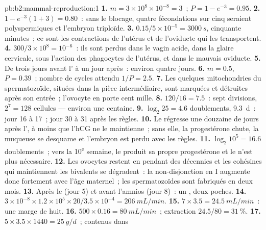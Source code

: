 \begin{solution}{pb:b2:mammal-reproduction:1}
\textbf{1.} $m = 3\times 10^{8}\times 10^{-8} = 3$~; $P = 1 - e^{-3} =
0.95$.
\textbf{2.} $1 - e^{-3}(1 + 3) = 0.80$~: sans le blocage, quatre
fécondations sur cinq seraient polyspermiques et l'embryon triploïde.
\textbf{3.} $0.15/5\times 10^{-5} = \qty{3000}{s}$, cinquante minutes~;
ce sont les contractions de l'utérus et de l'oviducte qui les
transportent.
\textbf{4.} $300/3\times 10^{8} = 10^{-6}$~: ils sont perdus dans le
vagin acide, dans la glaire cervicale, sous l'action des phagocytes de
l'utérus, et dans le mauvais oviducte.
\textbf{5.} De trois jours avant l' à un jour après~: environ
quatre jours.
\textbf{6.} $m = 0.5$, $P = 0.39$~; nombre de cycles attendu $1/P = 2.5$.
\textbf{7.} Les quelques mitochondries du spermatozoïde, situées dans la
pièce intermédiaire, sont marquées et détruites après son entrée~;
l'ovocyte en porte cent mille.
\textbf{8.} $120/16 = 7.5$~: sept divisions, $2^{7} = 128$ cellules ---
environ une centaine.
\textbf{9.} $\log_2 25 = 4.6$ doublements, \qty{9.3}{d}~: jour 16 à 17~;
jour 30 à 31 après les règles.
\textbf{10.} Le  régresse une douzaine de jours après
l', à moins que l'hCG ne le maintienne~; sans elle, la
progestérone chute, la muqueuse se desquame et l'embryon est perdu avec
les règles.
\textbf{11.} $\log_2 10^{5} = 16.6$ doublements~; vers la
10\textsuperscript{e} semaine, le  produit sa propre
progestérone et le  n'est plus nécessaire.
\textbf{12.} Les ovocytes restent en  pendant des décennies et
les cohésines qui maintiennent les bivalents se dégradent~: la
non-disjonction en  I augmente donc fortement avec l'âge
maternel~; les spermatozoïdes sont fabriqués en deux mois.
\textbf{13.} Après le  (jour 5) et avant l'amnios (jour
8)~: un , deux poches.
\textbf{14.} $3\times 10^{-8}\times 1.2\times 10^{5}\times 20/3.5\times
10^{-4} = \qty{206}{mL/min}$.
\textbf{15.} $7\times 3.5 = \qty{24.5}{mL/min}$~: une marge de huit.
\textbf{16.} $500\times 0.16 = \qty{80}{mL/min}$~; extraction
$24.5/80 = \qty{31}{\%}$.
\textbf{17.} $5\times 3.5\times 1440 = \qty{25}{g/d}$~; contenus dans

\end{solution}
